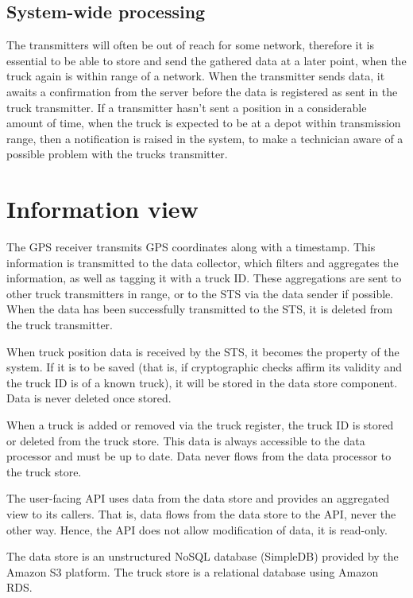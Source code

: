 \documentclass[a4paper,11pt]{report}
\begin{document}
\subsection{System-wide processing}
\label{sec:syst-wide-proc}

The transmitters will often be out of reach for some network, therefore it is essential to be able to store and send the gathered data at a later point, when the truck again is within range of a network. When the transmitter sends data, it awaits a confirmation from the server before the data is registered as sent in the truck transmitter. If a transmitter hasn't sent a position in a considerable amount of time, when the truck is expected to be at a depot within transmission range, then a notification is raised in the system, to make a technician aware of a possible problem with the trucks transmitter. 


\section{Information view}
\label{cha:information-view}


The GPS receiver transmits GPS coordinates along with a timestamp.
This information is transmitted to the data collector, which filters
and aggregates the information, as well as tagging it with a truck ID.
These aggregations are sent to other truck transmitters in range, or
to the STS via the data sender if possible.  When the data has been
successfully transmitted to the STS, it is deleted from the truck
transmitter.

When truck position data is received by the STS, it becomes the
property of the system.  If it is to be saved (that is, if
cryptographic checks affirm its validity and the truck ID is of a
known truck), it will be stored in the data store component.  Data is
never deleted once stored.

When a truck is added or removed via the truck register, the truck ID
is stored or deleted from the truck store.  This data is always
accessible to the data processor and must be up to date.  Data never
flows from the data processor to the truck store.

The user-facing API uses data from the data store and provides an
aggregated view to its callers.  That is, data flows from the data
store to the API, never the other way.  Hence, the API does not allow
modification of data, it is read-only.

The data store is an unstructured NoSQL database (SimpleDB) provided
by the Amazon S3 platform.  The truck store is a relational database
using Amazon RDS.
\end{document}
